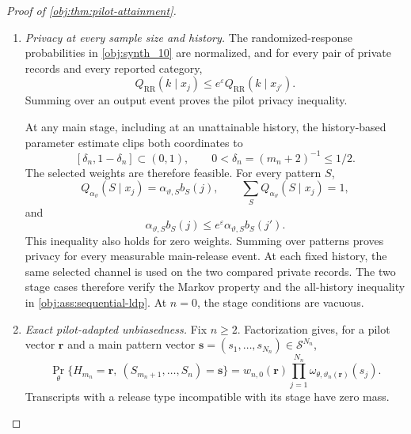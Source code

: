 \documentclass[11pt]{article}
\begin{document}
\begin{proof}[Proof of \cref{obj:thm:pilot-attainment}]
\begin{enumerate}
For every \(x\in\mathbb R\) and \(\delta>0\),
\[
\begin{aligned}
\Pr_\theta\{\mathsf T_n\le x-\delta\}
-\Pr_\theta\{|\mathsf W_n-\mathsf T_n|\ge\delta\}
&\le\Pr_\theta\{\mathsf W_n\le x\}\\
&\le\Pr_\theta\{\mathsf T_n\le x+\delta\}
+\Pr_\theta\{|\mathsf W_n-\mathsf T_n|\ge\delta\}.
\end{aligned}
\]
Taking limits and then letting \(\delta\downarrow0\) proves convergence of the pivot distribution functions to \(\Phi\). The closed interval
\([-z_{1-\gamma/2},z_{1-\gamma/2}]\) has zero normal boundary mass, so
\[
\Pr_\theta\{|\mathsf W_n|\le z_{1-\gamma/2}\}
\longrightarrow
N(0,1)([-z_{1-\gamma/2},z_{1-\gamma/2}]).
\]
The event equivalence transfers this limit to the stated Wald event.

\item \emph{Privacy at every sample size and history.}
The randomized-response probabilities in \cref{obj:synth_10} are normalized, and for every pair of private records and every reported category,
\[
Q_{\mathrm{RR}}(k\mid x_j)
\le e^\varepsilon Q_{\mathrm{RR}}(k\mid x_{j'}).
\]
Summing over an output event proves the pilot privacy inequality.

At any main stage, including at an unattainable history, the history-based parameter estimate clips both coordinates to
\[
[\delta_n,1-\delta_n]\subset(0,1),
\qquad
0<\delta_n=(m_n+2)^{-1}\le1/2.
\]
The selected weights are therefore feasible. For every pattern \(S\),
\[
Q_{\alpha_\vartheta}(S\mid x_j)
=\alpha_{\vartheta,S}b_S(j),
\qquad
\sum_SQ_{\alpha_\vartheta}(S\mid x_j)=1,
\]
and
\[
\alpha_{\vartheta,S}b_S(j)
\le e^\varepsilon\alpha_{\vartheta,S}b_S(j').
\]
This inequality also holds for zero weights. Summing over patterns proves privacy for every measurable main-release event. At each fixed history, the same selected channel is used on the two compared private records. The two stage cases therefore verify the Markov property and the all-history inequality in \cref{obj:ass:sequential-ldp}. At \(n=0\), the stage conditions are vacuous.

\item \emph{Exact pilot-adapted unbiasedness.}
Fix \(n\ge2\). Factorization gives, for a pilot vector \(\mathbf r\) and a main pattern vector
\(\mathbf s=(s_1,\ldots,s_{N_n})\in\mathcal S^{N_n}\),
\[
\Pr_\theta\{H_{m_n}=\mathbf r,\ (S_{m_n+1},\ldots,S_n)=\mathbf s\}
=
w_{n,0}(\mathbf r)
\prod_{j=1}^{N_n}
\omega_{\theta,\vartheta_n(\mathbf r)}(s_j).
\]
Transcripts with a release type incompatible with its stage have zero mass.


\end{enumerate}
\end{proof}
\end{document}
